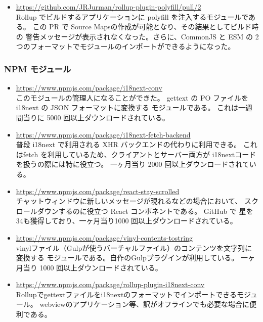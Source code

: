 \documentclass{res}
\begin{document}
\begin{resume}
\begin{itemize}
  \item \url{https://github.com/JRJurman/rollup-plugin-polyfill/pull/2} \\
  Rollup でビルドするアプリケーションに polyfill を注入するモジュールである。
  この PR で Source Mapsの作成が可能となり、その結果としてビルド時の
  警告メッセージが表示されなくなった。さらに、CommonJS と ESM の
  2 つのフォーマットでモジュールのインポートができるようになった。

\end{itemize}

\subsubsection{NPM モジュール}

\begin{itemize}
  \item \url{https://www.npmjs.com/package/i18next-conv} \\
  このモジュールの管理人になることができた。
  gettext の PO ファイルを i18next の JSON フォーマットに変換する
  モジュールである。
  これは一週間当りに 5000 回以上ダウンロードされている。

  \item \url{https://www.npmjs.com/package/i18next-fetch-backend} \\
  普段 i18next で利用される XHR バックエンドの代わりに利用できる。
  これはfetch を利用しているため、クライアントとサーバー両方が
  i18nextコードを扱うの際には特に役立つ。
  一ヶ月当り 2000 回以上ダウンロードされている。

  \item \url{https://www.npmjs.com/package/react-stay-scrolled} \\
  チャットウィンドウに新しいメッセージが現れるなどの場合において、
  スクロールダウンするのに役立つ React コンポネントである。
  GitHub で 星を34も獲得しており、一ヶ月当り1000 回以上ダウンロードされている。

  \item \url{https://www.npmjs.com/package/vinyl-contents-tostring} \\
  vinylファイル（Gulpが使うバーチャルファイル）のコンテンツを文字列に変換する
  モジュールである。自作のGulpプラグインが利用している。
  一ヶ月当り 1000 回以上ダウンロードされている。

  \item \url{https://www.npmjs.com/package/rollup-plugin-i18next-conv} \\
  Rollupでgettextファイルをi18nextのフォーマットでインポートできるモジュール。
  webviewのアプリケーション等、訳がオフラインでも必要な場合に便利である。


\end{itemize}
\end{resume}
\end{document}
